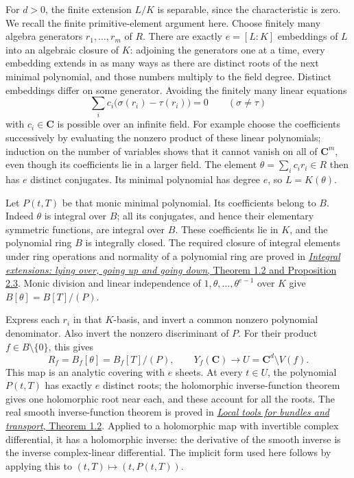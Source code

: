 \documentclass[
  11pt,
  a4paper,
]{article}
\begin{document}
For \(d>0\), the finite extension \(L/K\) is separable, since the
characteristic is zero. We recall the finite primitive-element argument
here. Choose finitely many algebra generators \(r_1,\ldots,r_m\) of
\(R\). There are exactly \(e=[L:K]\) embeddings of \(L\) into an
algebraic closure of \(K\): adjoining the generators one at a time,
every embedding extends in as many ways as there are distinct roots of
the next minimal polynomial, and those numbers multiply to the field
degree. Distinct embeddings differ on some generator. Avoiding the
finitely many linear equations \[
 \sum_i c_i\bigl(\sigma(r_i)-\tau(r_i)\bigr)=0
       \qquad(\sigma\ne\tau)
\] with \(c_i\in\mathbf C\) is possible over an infinite field. For
example choose the coefficients successively by evaluating the nonzero
product of these linear polynomials; induction on the number of
variables shows that it cannot vanish on all of \(\mathbf C^m\), even
though its coefficients lie in a larger field. The element
\(\theta=\sum_i c_i r_i\in R\) then has \(e\) distinct conjugates. Its
minimal polynomial has degree \(e\), so \(L=K(\theta)\).

Let \(P(t,T)\) be that monic minimal polynomial. Its coefficients belong
to \(B\). Indeed \(\theta\) is integral over \(B\); all its conjugates,
and hence their elementary symmetric functions, are integral over \(B\).
These coefficients lie in \(K\), and the polynomial ring \(B\) is
integrally closed. The required closure of integral elements under ring
operations and normality of a polynomial ring are proved in
\href{https://kokunoyumeto.github.io/open-math-courses-public/courses/AG-CA/AG-CA-05.html}{\emph{Integral extensions: lying over,
going up and going down}, Theorem 1.2 and Proposition 2.3}. Monic
division and linear independence of \(1,\theta,\ldots,\theta^{e-1}\)
over \(K\) give \(B[\theta]=B[T]/(P)\).

Express each \(r_i\) in that \(K\)-basis, and invert a common nonzero
polynomial denominator. Also invert the nonzero discriminant of \(P\).
For their product \(f\in B\setminus\{0\}\), this gives \[
 R_f=B_f[\theta]=B_f[T]/(P),\qquad
 Y_f(\mathbf C)\longrightarrow U=\mathbf C^d\setminus V(f).
 \tag{22.104}
\] This map is an analytic covering with \(e\) sheets. At every
\(t\in U\), the polynomial \(P(t,T)\) has exactly \(e\) distinct roots;
the holomorphic inverse-function theorem gives one holomorphic root near
each, and these account for all the roots. The real smooth
inverse-function theorem is proved in
\href{https://kokunoyumeto.github.io/open-math-courses-public/courses/DG-FND/local-tools-for-bundles-and-transport.html\#1-contraction-and-local-inversion}{\emph{Local
tools for bundles and transport}, Theorem 1.2}. Applied to a holomorphic
map with invertible complex differential, it has a holomorphic inverse:
the derivative of the smooth inverse is the inverse complex-linear
differential. The implicit form used here follows by applying this to
\((t,T)\mapsto(t,P(t,T))\).
\end{document}
